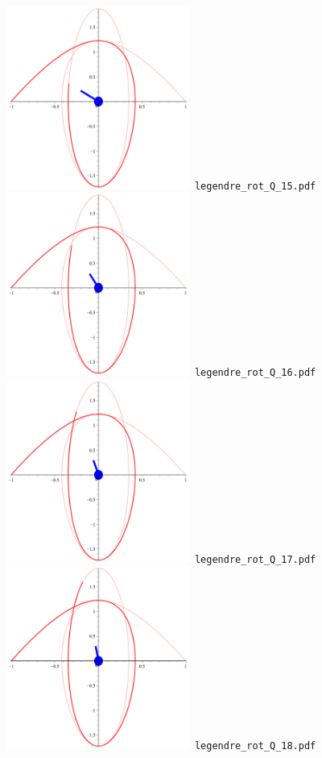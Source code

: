 \documentclass[a4paper]{amsart}
\begin{document}
\includegraphics[width=6cm]{legendre_rot_Q_15.pdf}\verb+ legendre_rot_Q_15.pdf+\\
\includegraphics[width=6cm]{legendre_rot_Q_16.pdf}\verb+ legendre_rot_Q_16.pdf+\\
\includegraphics[width=6cm]{legendre_rot_Q_17.pdf}\verb+ legendre_rot_Q_17.pdf+\\
\includegraphics[width=6cm]{legendre_rot_Q_18.pdf}\verb+ legendre_rot_Q_18.pdf+\\
\end{document}
